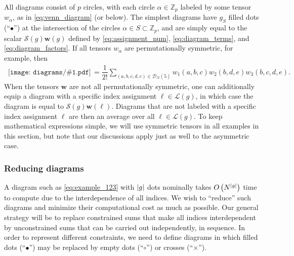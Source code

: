 \documentclass[nofootinbib,notitlepage,11pt]{revtex4-2}
\newcommand{\f}[2]{\dfrac{#1}{#2}} %
\newcommand{\p}[1]{\left(#1\right)} %
\newcommand{\m}{\bm} %
\newcommand{\1}{\mathds{1}}
\newcommand{\D}{\mathcal{D}}
\renewcommand{\L}{\mathcal{L}}
\renewcommand{\S}{\mathcal{S}}
\newcommand{\ZZ}{\mathbb{Z}}
\newcommand{\diagram}[1]
{\,\texttt{[image: diagrams/\#1.pdf]}\,}
\begin{document}
All diagrams consist of $p$ circles, with each circle $\alpha\in\ZZ_p$
labeled by some tensor $w_\alpha$, as in \eqref{eq:venn_diagram} (or
below).  The simplest diagrams have $g_S$ filled dots (``$\bullet$'')
at the intersection of the circles $\alpha\in S\subset\ZZ_p$, and are
simply equal to the scalar $\S\p{g} \m w\p{g}$ defined by
\eqref{eq:assignment_num}, \eqref{eq:diagram_terms}, and
\eqref{eq:diagram_factors}.  If all tensors $w_\alpha$ are
permutationally symmetric, for example, then
\begin{align}
  \diagram{example_123}
  = \f1{2!} \sum_{\p{a,b,c,d,e}\in\D_N\p{5}}
  w_1\p{a,b,c} w_2\p{b,d,e} w_3\p{b,c,d,e}.
  \label{eq:example_123}
\end{align}
When the tensors $\m w$ are not all permutationally symmetric, one can
additionally equip a diagram with a specific index assignment
$\ell\in\L\p{g}$, in which case the diagram is equal to
$\S\p{g} \m w\p{\ell}$.  Diagrams that are not labeled with a specific
index assignment $\ell$ are then an average over all $\ell\in\L\p{g}$.
To keep mathematical expressions simple, we will use symmetric tensors
in all examples in this section, but note that our discussions apply
just as well to the asymmetric case.

\subsubsection{Reducing diagrams}

A diagram such as \eqref{eq:example_123} with $\abs{g}$ dots nominally
takes $O\p{N^{\abs{g}}}$ time to compute due to the interdependence of
all indices.  We wish to ``reduce'' such diagrams and minimize their
computational cost as much as possible.  Our general strategy will be
to replace constrained sums that make all indices interdependent by
unconstrained sums that can be carried out independently, in sequence.
In order to represent different constraints, we need to define
diagrams in which filled dots (``$\bullet$'') may be replaced by empty
dots (``$\circ$'') or crosses (``$\bm\times$'').
\end{document}
